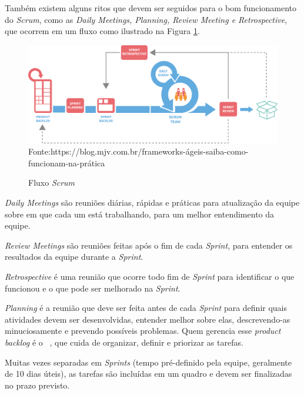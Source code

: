 Também existem alguns ritos que devem ser seguidos para o bom funcionamento do \textit{Scrum}, como as \textit{Daily Meetings, Planning, Review Meeting e Retrospective}, que ocorrem em um fluxo como ilustrado na Figura \ref{fig:scrum}.

\begin{figure}[H]
\centering
\caption{Fluxo \textit{Scrum}} %
\includegraphics[scale=0.15]{Scrum}\\  %
{\small Fonte:https://blog.mjv.com.br/frameworks-ágeis-saiba-como-funcionam-na-prática} %
\label{fig:scrum} %
\end{figure}

\textit{Daily Meetings} são reuniões diárias, rápidas e práticas para atualização da equipe sobre em que cada um está trabalhando, para um melhor entendimento da equipe.

\textit{Review Meetings} são reuniões feitas após o fim de cada \textit{Sprint}, para entender os resultados da equipe durante a \textit{Sprint}.

\textit{Retrospective} é uma reunião que ocorre todo fim de \textit{Sprint} para identificar o que funcionou e o que pode ser melhorado na \textit{Sprint}.

\textit{Planning} é a reunião que deve ser feita antes de cada \textit{Sprint} para definir quais atividades devem ser desenvolvidas, entender melhor sobre elas, descrevendo-as minuciosamente e prevendo possíveis problemas.
Quem gerencia esse \textit{product backlog} é o  ~, que cuida de organizar, definir e priorizar as tarefas.

Muitas vezes separadas em \textit{Sprints} (tempo pré-definido pela equipe, geralmente de 10 dias úteis), as tarefas são incluídas em um quadro e devem ser finalizadas no prazo previsto.

